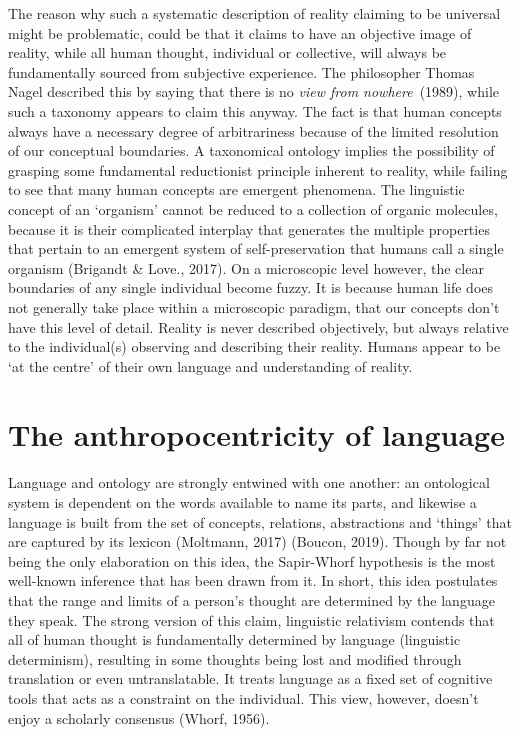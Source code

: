 The reason why such a systematic description of reality claiming to be universal might be problematic, could be that it claims to have an objective image of reality, while all human thought, individual or collective, will always be fundamentally sourced from subjective experience. The philosopher Thomas Nagel described this by saying that there is no \textit{view from nowhere}\ (1989), while such a taxonomy appears to claim this anyway. The fact is that human concepts always have a necessary degree of arbitrariness because of the limited resolution of our conceptual boundaries. A taxonomical ontology implies the possibility of grasping some fundamental reductionist principle inherent to reality, while failing to see that many human concepts are emergent phenomena. The linguistic concept of an ‘organism’ cannot be reduced to a collection of organic molecules, because it is their complicated interplay that generates the multiple properties that pertain to an emergent system of self-preservation that humans call a single organism (Brigandt \& Love., 2017). On a microscopic level however, the clear boundaries of any single individual become fuzzy. It is because human life does not generally take place within a microscopic paradigm, that our concepts don’t have this level of detail. Reality is never described objectively, but always relative to the individual(s) observing and describing their reality. Humans appear to be ‘at the centre’ of their own language and understanding of reality. 

\section{The anthropocentricity of language}

Language and ontology are strongly entwined with one another: an ontological system is dependent on the words available to name its parts, and likewise a language is built from the set of concepts, relations, abstractions and ‘things’ that are captured by its lexicon  (Moltmann, 2017) (Boucon, 2019). Though by far not being the only elaboration on this idea, the Sapir-Whorf hypothesis is the most well-known inference that has been drawn from it. In short, this idea postulates that the range and limits of a person’s thought are determined by the language they speak. The strong version of this claim, linguistic relativism contends that all of human thought is fundamentally determined by language (linguistic determinism), resulting in some thoughts being lost and modified through translation or even untranslatable. It treats language as a fixed set of cognitive tools that acts as a constraint on the individual. This view, however, doesn’t enjoy a scholarly consensus (Whorf, 1956).  

